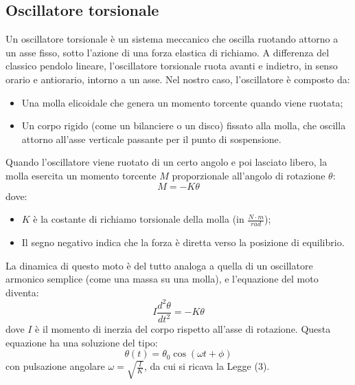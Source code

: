 \subsection{Oscillatore torsionale}
Un oscillatore torsionale è un sistema meccanico che oscilla ruotando attorno a un asse fisso, sotto l'azione di una forza elastica di richiamo. A differenza del classico pendolo lineare, l'oscillatore torsionale ruota avanti e indietro, in senso orario e antiorario, intorno a un asse. Nel nostro caso, l'oscillatore è composto da:
\begin{itemize}
	\item Una molla elicoidale che genera un momento torcente quando viene ruotata;
	\item Un corpo rigido (come un bilanciere o un disco) fissato alla molla, che oscilla attorno all'asse verticale passante per il punto di sospensione.
\end{itemize}
Quando l'oscillatore viene ruotato di un certo angolo e poi lasciato libero, la molla esercita un momento torcente $M$ proporzionale all'angolo di rotazione $\theta$:
\begin{equation}
	M = -K\theta
\end{equation}
dove:
\begin{itemize}
	\item $K$ è la costante di richiamo torsionale della molla (in $\frac{N\cdot m}{rad}$);
	\item Il segno negativo indica che la forza è diretta verso la posizione di equilibrio.
\end{itemize}
La dinamica di questo moto è del tutto analoga a quella di un oscillatore armonico semplice (come una massa su una molla), e l'equazione del moto diventa:
\begin{equation}
	I\frac{d^2\theta}{dt^2} = -K\theta
\end{equation}
dove $I$ è il momento di inerzia del corpo rispetto all'asse di rotazione. Questa equazione ha una soluzione del tipo:
\begin{equation}
	\theta(t)=\theta_0\cos(\omega t+\phi)
\end{equation}
con pulsazione angolare $\omega=\sqrt{\frac{I}{K}}$, da cui si ricava la Legge (3).


